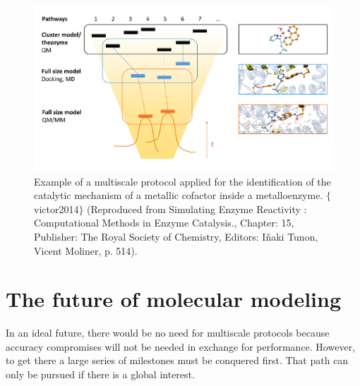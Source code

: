\begin{figure}[H]
		\includegraphics[width=\textwidth]{./figures/01/multiscaleprotocol.png}
		\caption[Example of a multiscale protocol]{Example of a multiscale protocol applied for the identification of the catalytic mechanism of a metallic cofactor inside a metalloenzyme. $ \{ $ victor2014$ \} $  (Reproduced from Simulating Enzyme Reactivity : Computational Methods in Enzyme Catalysis., Chapter: 15, Publisher: The Royal Society of Chemistry, Editors: Iñaki Tunon, Vicent Moliner, p. 514).}
		\label{fig:multiscale}
\end{figure}





\section{The future of molecular modeling}
In an ideal future, there would be no need for multiscale protocols because accuracy compromises will not be needed in exchange for performance. However, to get there a large series of milestones must be conquered first. That path can only be pursued if there is a global interest.

